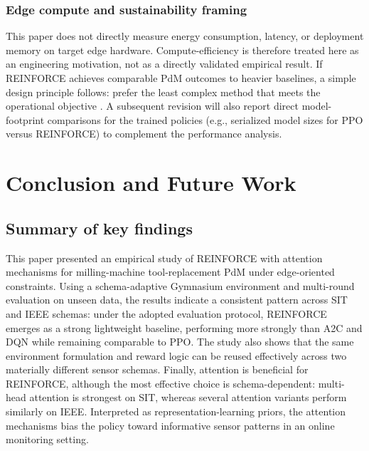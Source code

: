 \documentclass[sn-basic]{sn-jnl} %
\begin{document}
\subsubsection{Edge compute and sustainability framing}
This paper does not directly measure energy consumption, latency, or deployment memory on target edge hardware. Compute-efficiency is therefore treated here as an engineering motivation, not as a directly validated empirical result. If \textsc{REINFORCE} achieves comparable PdM outcomes to heavier baselines, a simple design principle follows: prefer the least complex method that meets the operational objective \cite{Schwartz2020, Strubell2019}. A subsequent revision will also report direct model-footprint comparisons for the trained policies (e.g., serialized model sizes for PPO versus \textsc{REINFORCE}) to complement the performance analysis.

\section{Conclusion and Future Work}
\label{sec:conclusion}
\subsection{Summary of key findings}
This paper presented an empirical study of \textsc{REINFORCE} with attention mechanisms for milling-machine tool-replacement PdM under edge-oriented constraints. Using a schema-adaptive Gymnasium environment and multi-round evaluation on unseen data, the results indicate a consistent pattern across SIT and IEEE schemas: under the adopted evaluation protocol, \textsc{REINFORCE} emerges as a strong lightweight baseline, performing more strongly than \textsc{A2C} and \textsc{DQN} while remaining comparable to \textsc{PPO}. The study also shows that the same environment formulation and reward logic can be reused effectively across two materially different sensor schemas. Finally, attention is beneficial for \textsc{REINFORCE}, although the most effective choice is schema-dependent: multi-head attention is strongest on SIT, whereas several attention variants perform similarly on IEEE. Interpreted as representation-learning priors, the attention mechanisms bias the policy toward informative sensor patterns in an online monitoring setting.
\end{document}
